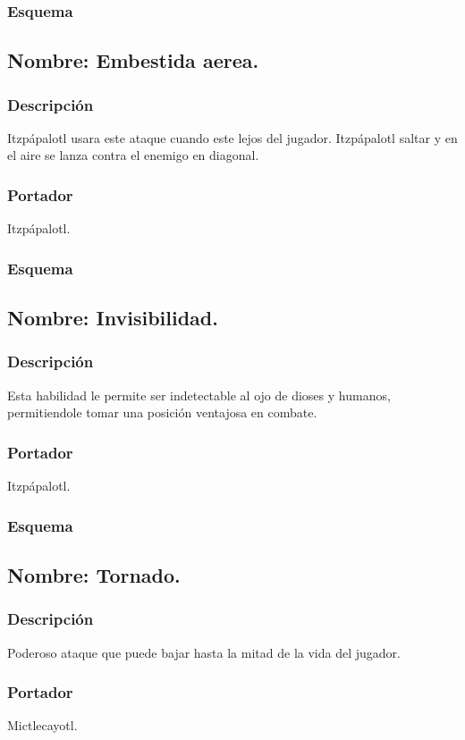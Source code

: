 \documentclass[11pt,letterpaper]{article}
\begin{document}
\subsubsection{Esquema}
\subsection{Nombre: Embestida aerea.}
\subsubsection{Descripción}
Itzpápalotl usara este ataque cuando este lejos del jugador. Itzpápalotl saltar y en el aire se lanza contra el enemigo en diagonal.
\subsubsection{Portador}
Itzpápalotl.
\subsubsection{Esquema}
\subsection{Nombre: Invisibilidad.}
\subsubsection{Descripción}
Esta habilidad le permite ser indetectable al ojo de dioses y humanos, permitiendole tomar una posición ventajosa en combate.
\subsubsection{Portador}
Itzpápalotl.
\subsubsection{Esquema}
\subsection{Nombre: Tornado.}
\subsubsection{Descripción}
Poderoso ataque que puede bajar hasta la mitad de la vida del jugador.
\subsubsection{Portador}
Mictlecayotl.
\end{document}
